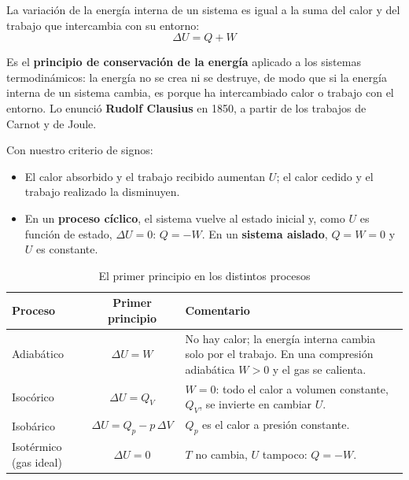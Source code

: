 \begin{definition}
    La variación de la energía interna de un sistema es igual a la suma del calor y del trabajo que intercambia con su entorno:
    \[ \Delta U = Q + W \]
\end{definition}

Es el \textbf{principio de conservación de la energía} aplicado a los sistemas termodinámicos: la energía no se crea ni se
destruye, de modo que si la energía interna de un sistema cambia, es porque ha intercambiado calor o trabajo con el entorno. Lo
enunció \textbf{Rudolf Clausius} en 1850, a partir de los trabajos de Carnot y de Joule.

Con nuestro criterio de signos:
\begin{itemize}
    \item El calor absorbido y el trabajo recibido aumentan \(U\); el calor cedido y el trabajo realizado la disminuyen.
    \item En un \textbf{proceso cíclico}, el sistema vuelve al estado inicial y, como \(U\) es función de estado,
    \(\Delta U = 0\): \(Q = -W\). En un \textbf{sistema aislado}, \(Q = W = 0\) y \(U\) es constante.
\end{itemize}

\begin{table}[H]
    \centering
    \caption{El primer principio en los distintos procesos}
    \vspace{-5pt}
    \begin{tabular}{@{}lcL{7.8cm}@{}}
        \toprule
        \textbf{Proceso} & \textbf{Primer principio} & \textbf{Comentario} \\
        \midrule
        Adiabático & \(\Delta U = W\) & No hay calor; la energía interna cambia solo por el trabajo. En una compresión
        adiabática \(W > 0\) y el gas se calienta. \\[3pt]
        Isocórico & \(\Delta U = Q_V\) & \(W = 0\): todo el calor a volumen constante, \(Q_V\), se invierte en cambiar \(U\). \\[3pt]
        Isobárico & \(\Delta U = Q_p - p\,\Delta V\) & \(Q_p\) es el calor a presión constante. \\[3pt]
        Isotérmico (gas ideal) & \(\Delta U = 0\) & \(T\) no cambia, \(U\) tampoco: \(Q = -W\). \\
        \bottomrule
    \end{tabular}
    \label{tab:ud13-primer-principio}
\end{table}

